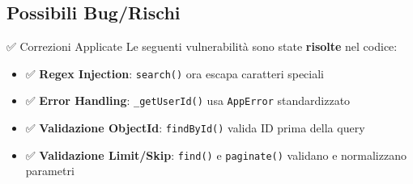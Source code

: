 \documentclass[11pt,a4paper]{article}
\begin{document}
\subsection{Possibili Bug/Rischi}

\begin{importantbox}{✅ Correzioni Applicate}
Le seguenti vulnerabilità sono state \textbf{risolte} nel codice:
\begin{itemize}
    \item ✅ \textbf{Regex Injection}: \texttt{search()} ora escapa caratteri speciali
    \item ✅ \textbf{Error Handling}: \texttt{\_getUserId()} usa \texttt{AppError} standardizzato
    \item ✅ \textbf{Validazione ObjectId}: \texttt{findById()} valida ID prima della query
    \item ✅ \textbf{Validazione Limit/Skip}: \texttt{find()} e \texttt{paginate()} validano e normalizzano parametri
\end{itemize}
\end{importantbox}
\end{document}
